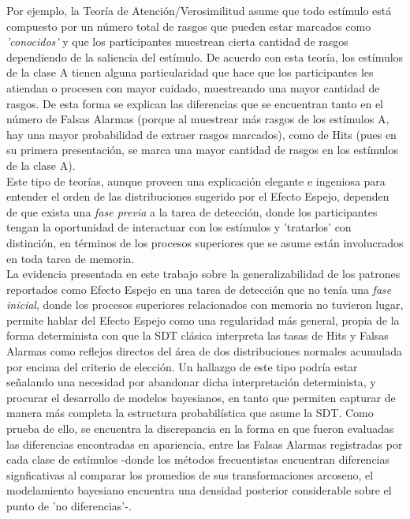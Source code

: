 Por ejemplo, la Teoría de Atención/Verosimilitud asume que todo estímulo está compuesto por un número total de rasgos que pueden estar marcados como \textit{'conocidos'} y que los participantes muestrean cierta cantidad de rasgos dependiendo de la saliencia del estímulo. De acuerdo con esta teoría, los estímulos de la clase A tienen alguna particularidad que hace que los participantes les atiendan o procesen con mayor cuidado, muestreando una mayor cantidad de rasgos. De esta forma se explican las diferencias que se encuentran tanto en el número de Falsas Alarmas (porque al muestrear más rasgos de los estímulos A, hay una mayor probabilidad de extraer rasgos marcados), como de Hits (pues en su primera presentación, se marca una mayor cantidad de rasgos en los estímulos de la clase A).\\

Este tipo de teorías, aunque proveen una explicación elegante e ingeniosa para entender el orden de las distribuciones sugerido por el Efecto Espejo, dependen de que exista una \textit{fase previa} a la tarea de detección, donde los participantes tengan la oportunidad de interactuar con los estímulos y 'tratarlos' con distinción, en términos de los procesos superiores que se asume están involucrados en toda tarea de memoria.\\

La evidencia presentada en este trabajo sobre la generalizabilidad de los patrones reportados como Efecto Espejo en una tarea de detección que no tenía una \textit{fase inicial}, donde los procesos superiores relacionados con memoria no tuvieron lugar, permite hablar del Efecto Espejo como una regularidad más general, propia de la forma determinista con que la SDT clásica interpreta las tasas de Hits y Falsas Alarmas como reflejos directos del área de dos distribuciones normales acumulada por encima del criterio de elección. Un hallazgo de este tipo podría estar señalando una necesidad por abandonar dicha interpretación determinista, y procurar el desarrollo de modelos bayesianos, en tanto que permiten capturar de manera más completa la estructura probabilística que asume la SDT. Como prueba de ello, se encuentra la discrepancia en la forma en que fueron evaluadas las diferencias encontradas en apariencia, entre las Falsas Alarmas registradas por cada clase de estímulos -donde los métodos frecuentistas encuentran diferencias signficativas al comparar los promedios de sus transformaciones arcoseno, el modelamiento bayesiano encuentra una densidad posterior considerable sobre el punto de 'no diferencias'-.\\

